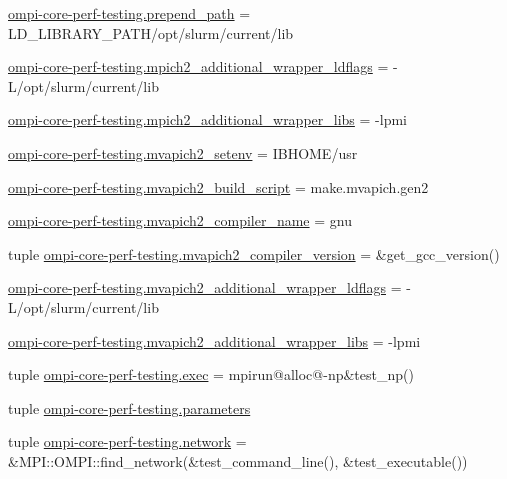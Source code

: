 \begin{DoxyCompactItemize}
\item 
\hyperlink{namespaceompi-core-perf-testing_af79469a4a6041fcd16be3bde9d09e109}{ompi-\/core-\/perf-\/testing.\-prepend\-\_\-path} = L\-D\-\_\-\-L\-I\-B\-R\-A\-R\-Y\-\_\-\-P\-A\-T\-H/opt/slurm/current/lib
\item 
\hyperlink{namespaceompi-core-perf-testing_af90676eacbf08c8cdca48d2e50078288}{ompi-\/core-\/perf-\/testing.\-mpich2\-\_\-additional\-\_\-wrapper\-\_\-ldflags} = -\/L/opt/slurm/current/lib
\item 
\hyperlink{namespaceompi-core-perf-testing_af773f6fadd7d590602ecd2dd9b5ab051}{ompi-\/core-\/perf-\/testing.\-mpich2\-\_\-additional\-\_\-wrapper\-\_\-libs} = -\/lpmi
\item 
\hyperlink{namespaceompi-core-perf-testing_a68002d4d6e6a04e05980c8b2ae5b545e}{ompi-\/core-\/perf-\/testing.\-mvapich2\-\_\-setenv} = I\-B\-H\-O\-M\-E/usr
\item 
\hyperlink{namespaceompi-core-perf-testing_abfff00b4161e96bde810f9663393d72b}{ompi-\/core-\/perf-\/testing.\-mvapich2\-\_\-build\-\_\-script} = make.\-mvapich.\-gen2
\item 
\hyperlink{namespaceompi-core-perf-testing_aeed3a0308c22144a5231f51e5f1f1e01}{ompi-\/core-\/perf-\/testing.\-mvapich2\-\_\-compiler\-\_\-name} = gnu
\item 
tuple \hyperlink{namespaceompi-core-perf-testing_ab1de3bdc144731e9639d76187ffa8078}{ompi-\/core-\/perf-\/testing.\-mvapich2\-\_\-compiler\-\_\-version} = \&get\-\_\-gcc\-\_\-version()
\item 
\hyperlink{namespaceompi-core-perf-testing_a2fa43ea204acc1dcec3c162a8df26ddf}{ompi-\/core-\/perf-\/testing.\-mvapich2\-\_\-additional\-\_\-wrapper\-\_\-ldflags} = -\/L/opt/slurm/current/lib
\item 
\hyperlink{namespaceompi-core-perf-testing_a43fca8dff7f5401c4331cc8c4ce990e8}{ompi-\/core-\/perf-\/testing.\-mvapich2\-\_\-additional\-\_\-wrapper\-\_\-libs} = -\/lpmi
\item 
tuple \hyperlink{namespaceompi-core-perf-testing_af852fdd97d7de2e0bce32ec64104df81}{ompi-\/core-\/perf-\/testing.\-exec} = mpirun@alloc@-\/np\&test\-\_\-np()
\item 
tuple \hyperlink{namespaceompi-core-perf-testing_a8b296a0041782bf28f9debd480c136cc}{ompi-\/core-\/perf-\/testing.\-parameters}
\item 
tuple \hyperlink{namespaceompi-core-perf-testing_aba864d853cd3697f3a66573fef630d72}{ompi-\/core-\/perf-\/testing.\-network} = \&M\-P\-I\-::\-O\-M\-P\-I\-::find\-\_\-network(\&test\-\_\-command\-\_\-line(), \&test\-\_\-executable())

\end{DoxyCompactItemize}
